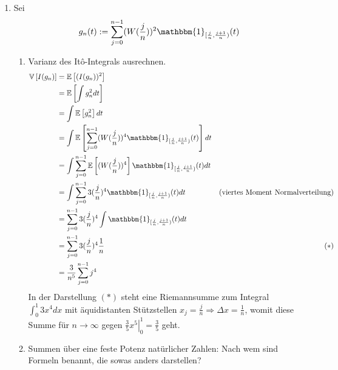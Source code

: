 \documentclass[a4paper,11pt,notitlepage,fullpage]{article}
\newcommand{\Ee}[1]{\mathbb E\left[#1\right]}
\newcommand{\Vv}[1]{\mathbb V\left[#1\right]}
\newcommand{\indd}[1]{\mathbbm{1}_{#1}}
\begin{document}
\begin{enumerate}
\item Sei
$$g_n(t) := \sum_{j=0}^{n-1} (W(\frac{j}{n}))^2 \indd{[\frac{j}{n}, \frac{j+1}{n})}(t)$$
\begin{enumerate}
\item Varianz des Itô-Integrals ausrechnen.
\begin{align*}
\Vv{I(g_n)} &= \Ee{(I(g_n))^2}\\
&=\Ee{\int g_n^2 dt}\\
&= \int \Ee{g_n^2} dt\\
&= \int \Ee{\sum_{j=0}^{n-1} (W(\frac{j}{n}))^4 \indd{[\frac{j}{n}, \frac{j+1}{n})}(t)} dt\\
&= \int \sum_{j=0}^{n-1} \Ee{(W(\frac{j}{n}))^4} \indd{[\frac{j}{n}, \frac{j+1}{n})}(t) dt\\
&= \int \sum_{j=0}^{n-1} 3(\frac{j}{n})^4 \indd{[\frac{j}{n}, \frac{j+1}{n})}(t) dt &\text{(viertes Moment Normalverteilung)}\\
&= \sum_{j=0}^{n-1} 3(\frac{j}{n})^4 \int \indd{[\frac{j}{n}, \frac{j+1}{n})}(t) dt\\
&= \sum_{j=0}^{n-1} 3(\frac{j}{n})^4 \frac{1}{n} &(*)\\
&= \frac{3}{n^5} \sum_{j=0}^{n-1} j^4 \\
\end{align*}
In der Darstellung $(*)$ steht eine Riemannsumme zum Integral $\int_0^1 3x^4 dx$ mit äquidistanten Stützstellen $x_j = \frac{j}{n} \Rightarrow \Delta x = \frac{1}{n}$, womit diese Summe für $n\rightarrow \infty$ gegen $\left. \frac{3}{5}x^5\right|_0^1 = \frac{3}{5}$ geht.

\item Summen über eine feste Potenz natürlicher Zahlen: Nach wem sind Formeln benannt, die sowas anders darstellen?


\end{enumerate}
\end{enumerate}
\end{document}
